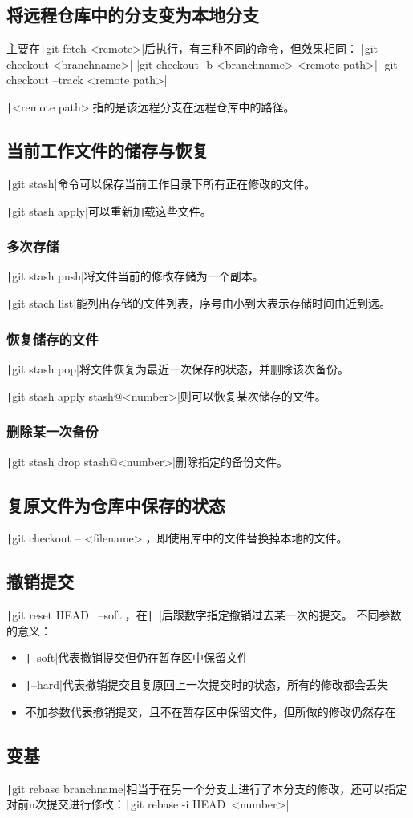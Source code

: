 \documentclass[fontset=ubuntu]{ctexart}
\begin{document}
\subsection{将远程仓库中的分支变为本地分支}
主要在\texttt|git fetch <remote>|后执行，有三种不同的命令，但效果相同：
|git checkout  <branchname>|
|git checkout -b <branchname> <remote path>|
|git checkout  --track <remote path>|

\texttt|<remote path>|指的是该远程分支在远程仓库中的路径。

\subsection{当前工作文件的储存与恢复}
\texttt|git stash|命令可以保存当前工作目录下所有正在修改的文件。

\texttt|git stash apply|可以重新加载这些文件。

\subsubsection{多次存储}
\texttt|git stash push|将文件当前的修改存储为一个副本。

\texttt|git stach list|能列出存储的文件列表，序号由小到大表示存储时间由近到远。

\subsubsection{恢复储存的文件}
\texttt|git stash pop|将文件恢复为最近一次保存的状态，并删除该次备份。

\texttt|git stash apply stash@{<number>}|则可以恢复某次储存的文件。

\subsubsection{删除某一次备份}
\texttt|git stash drop stash@{<number>}|删除指定的备份文件。

\subsection{复原文件为仓库中保存的状态}
\texttt|git checkout -- <filename>|，即使用库中的文件替换掉本地的文件。

\subsection{撤销提交}
\texttt|git reset HEAD~ --soft|，在\texttt|~|后跟数字指定撤销过去某一次的提交。
不同参数的意义：
\begin{itemize}
    \item \texttt|--soft|代表撤销提交但仍在暂存区中保留文件
    \item \texttt|--hard|代表撤销提交且复原回上一次提交时的状态，所有的修改都会丢失
    \item 不加参数代表撤销提交，且不在暂存区中保留文件，但所做的修改仍然存在
\end{itemize}

\subsection{变基}
\texttt|git rebase {branchname}|相当于在另一个分支上进行了本分支的修改，还可以指定对前n次提交进行修改：\texttt|git rebase -i HEAD~{<number>}|
\end{document}
